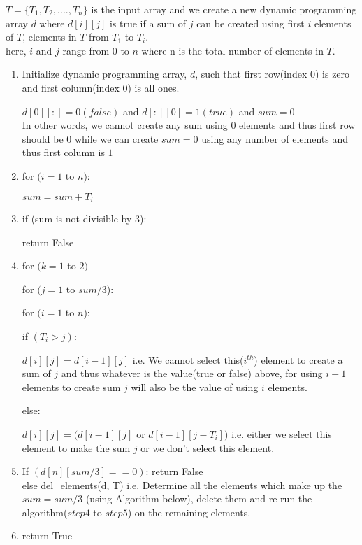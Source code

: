\documentclass[11pt]{article}
\begin{document}
$T = \{T_1, T_2,...., T_n \}$ is the input array and we create a new dynamic programming array $d$ where $d[i][j]$ is true 
if a sum of $j$ can be created using first $i$ elements of $T$, elements in $T$ from $T_1$ to $T_i$. \\
here, $i$ and $j$ range from $0$ to $n$ where n is the total number of elements in $T$.
\begin{enumerate}
	\item Initialize dynamic programming array, $d$, such that first row(index $0$) is zero and first column(index $0$) is all ones.
	
	\hspace{10mm} $d[0][:] = 0(false)$ and $d[:][0] = 1(true)$ and $sum = 0$ \\
	In other words, we cannot create any sum using 0 elements and thus first row should be $0$ while we can create $sum = 0$ using
	any  number of elements and thus first column is $1$
	\item for $(i = 1$ to $n)$:

	\hspace{10mm} $sum = sum + T_i$
	\item if (sum is not divisible by 3):
	
	\hspace{10mm} return False
	\item for $(k = 1$ to $2)$
	
	\hspace{5mm} for $(j = 1$ to $sum/3$):
	
	\hspace{10mm} for $(i = 1$ to $n$):
	
	\hspace{15mm} if $(T_i > j)$:
	
	\hspace{20mm} $d[i][j] = d[i-1][j]$ i.e. We cannot select this($i^{th}$) element to create a sum of $j$ and 
	thus whatever is the value(true or false) above, for using $i-1$ elements to create sum $j$ will also be the value of using $i$
	elements.
	
	\hspace{15mm} else:
	
	\hspace{20mm}  $d[i][j] = (d[i-1][j]$ or $d[i-1][j-T_i])$ i.e. either we select this element to make the sum $j$ or we 
	don't select this element.
	\item If $(d[n][sum/3] == 0)$: return False \\
	else del\_elements(d, T) i.e. Determine all the elements which make up the $sum = sum/3$ (using Algorithm below), delete 
	them and re-run the algorithm($step 4$ to $step 5$) on the remaining elements.
	\item return True
\end{enumerate}
\end{document}
